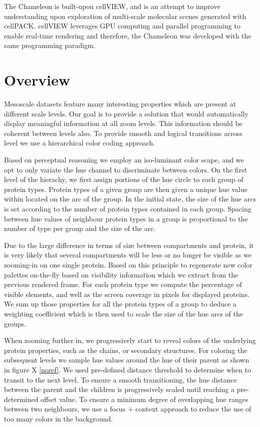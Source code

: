 \documentclass[review,journal]{vgtc}         %
\begin{document}
The Chameleon is built-upon cellVIEW, and is an attempt to improve understanding upon exploration of multi-scale molecular scenes generated with cellPACK.
cellVIEW leverages GPU computing and parallel programming to enable real-time rendering and therefore, the Chameleon was developed with the same programming paradigm.


\section{Overview}

Mesoscale datasets feature many interesting properties which are present at different scale levels.
Our goal is to provide a solution that would automatically display meaningful information at all zoom levels.
This information should be coherent between levels also.
To provide smooth and logical transitions across level we use a hierarchical color coding approach.

Based on perceptual reasoning we employ an iso-luminant color scape, and we opt to only variate the hue channel to discriminate between colors. 
On the first level of the hierachy, we first assign portions of the hue circle to each group of protein types.
Protein types of a given group are then given a unique hue value within located on the arc of the group.
In the initial state, the size of the hue arcs is set according to the number of protein types contained in each group. 
Spacing between hue values of neighbour protein types in a group is proportional to the number of type per group and the size of the arc. 

Due to the large difference in terms of size between compartments and protein, it is very likely that several compartments will be less or no longer be visible as we zooming-in on one single protein. 
Based on this principle to regenerate new color palettes on-the-fly based on visibility information which we extract from the previous rendered frame.
For each protein type we compute the percentage of visible elements, and well as the screen coverage in pixels for displayed proteins.
We sum up those properties for all the protein types of a group to deduce a weighting coefficient which is then used to scale the size of the hue arcs of the groups.

When zooming further in, we progressively start to reveal colors of the underlying protein properties, such as the chains, or secondary structures.
For coloring the subsequent levels we sample hue values around the hue of their parent as shown in figure X \ref{noref}.
We used pre-defined distance threshold to determine when to transit to the next level.
To ensure a smooth transitioning, the hue distance between the parent and the children is progressively scaled until reaching a pre-determined offset value.
To ensure a minimum degree of overlapping hue ranges between two neighbours, we use a focus + context approach to reduce the use of too many colors in the background.
\end{document}
